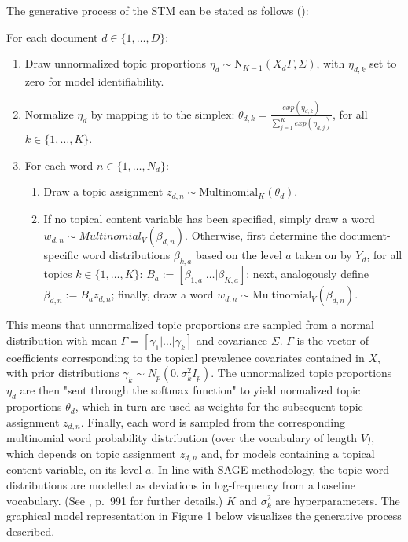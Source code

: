 \documentclass[12pt]{article}
\begin{document}
\noindent
The generative process of the STM can be stated as follows (\citealp{roberts2016model}):

\vspace{0.25cm}
\noindent
For each document $d \in \{1,\dots,D\}$:

\begin{enumerate}[{1)}]
\vspace{-0.25cm}
\item Draw unnormalized topic proportions $\eta_d \sim \text{N}_{K-1}(X_d\Gamma, \Sigma)$, with $\eta_{d,k}$ set to zero for model identifiability.
\vspace{-0.25cm}
\item Normalize $\eta_d$ by mapping it to the simplex: $\theta_{d,k} = \frac{exp(\eta_{d,k})}{\sum_{j=1}^{K}exp(\eta_{d,j})}$, for all $k \in \{1,\dots,K\}$.
\vspace{-0.25cm}
\item For each word $n \in \{1,\dots,N_d\}$:
	\begin{enumerate}[{a)}]
	\vspace{-0.25cm}    
    \item Draw a topic assignment $z_{d,n} \sim \text{Multinomial}_K(\theta_d)$.
	\vspace{-0.25cm}    
    \item If no topical content variable has been specified, simply draw a word $w_{d,n} \sim Multinomial_V(\beta_{d,n})$. Otherwise, first determine the document-specific word distributions $\beta_{k,a}$ based on the level $a$ taken on by $Y_d$, for all topics $k \in \{1,\dots,K\}$: $B_a := [\beta_{1,a}|\dots|\beta_{K,a}]$; next, analogously define $\beta_{d,n}:=B_az_{d,n}$; finally, draw a word $w_{d,n} \sim \text{Multinomial}_V(\beta_{d,n})$.
	\end{enumerate}
\end{enumerate}

\noindent
This means that unnormalized topic proportions are sampled from a normal distribution with mean $\Gamma = [\gamma_1|\dots|\gamma_k]$ and covariance $\Sigma$. $\Gamma$ is the vector of coefficients corresponding to the topical prevalence covariates contained in $X$, with prior distributions $\gamma_k \sim N_p(0, \sigma_k^2I_p)$. The unnormalized topic proportions $\eta_d$ are then "sent through the softmax function" to yield normalized topic proportions $\theta_d$, which in turn are used as weights for the subsequent topic assignment $z_{d,n}$. Finally, each word is sampled from the corresponding multinomial word probability distribution (over the vocabulary of length $V$), which depends on topic assignment $z_{d,n}$ and, for models containing a topical content variable, on its level $a$. In line with SAGE methodology, the topic-word distributions are modelled as deviations in log-frequency from a baseline vocabulary. (See \cite{roberts2016model}, p.\ 991 for further details.) $K$ and $\sigma_k^2$ are hyperparameters. The graphical model representation in Figure 1 below visualizes the generative process described.
\end{document}
